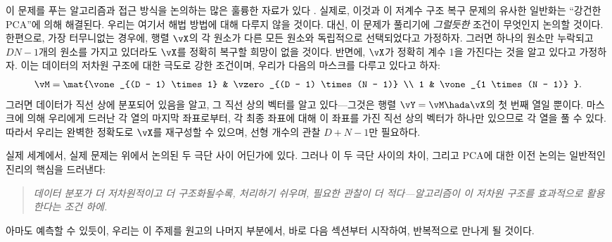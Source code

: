 \documentclass[../../book-main_ko.tex]{subfiles}
\begin{document}
이 문제를 푸는 알고리즘과 접근 방식을 논의하는 많은 훌륭한 자료가 있다 \cite{Wright-Ma-2022}. 실제로, 이것과 이 저계수 구조 복구 문제의 유사한 일반화는 ``강건한 PCA''에 의해 해결된다. 우리는 여기서 해법 방법에 대해 다루지 않을 것이다. 대신, 이 문제가 풀리기에 \textit{그럴듯한} 조건이 무엇인지 논의할 것이다. 한편으로, 가장 터무니없는 경우에, 행렬 \(\vX\)의 각 원소가 다른 모든 원소와 독립적으로 선택되었다고 가정하자. 그러면 하나의 원소만 누락되고 \(DN - 1\)개의 원소를 가지고 있더라도 \(\vX\)를 정확히 복구할 희망이 없을 것이다. 반면에, \(\vX\)가 정확히 계수 1을 가진다는 것을 알고 있다고 가정하자. 이는 데이터의 저차원 구조에 대한 극도로 강한 조건이며, 우리가 다음의 마스크를 다루고 있다고 하자:
\begin{equation}
    \vM = \mat{\vone_{(D - 1) \times 1} & \vzero_{(D - 1) \times (N - 1)} \\ 1 & \vone_{1 \times (N - 1)} }.
\end{equation}
그러면 데이터가 직선 상에 분포되어 있음을 알고, 그 직선 상의 벡터를 알고 있다---그것은 행렬 \(\vY = \vM \hada \vX\)의 첫 번째 열일 뿐이다. 마스크에 의해 우리에게 드러난 각 열의 마지막 좌표로부터, 각 최종 좌표에 대해 이 좌표를 가진 직선 상의 벡터가 하나만 있으므로 각 열을 풀 수 있다. 따라서 우리는 완벽한 정확도로 \(\vX\)를 재구성할 수 있으며, 선형 개수의 관찰 \(D + N - 1\)만 필요하다.

실제 세계에서, 실제 문제는 위에서 논의된 두 극단 사이 어딘가에 있다. 그러나 이 두 극단 사이의 차이, 그리고 PCA에 대한 이전 논의는 일반적인 진리의 핵심을 드러낸다:
\begin{quote}
    \centering
    \textit{데이터 분포가 더 저차원적이고 더 구조화될수록, 처리하기 쉬우며, 필요한 관찰이 더 적다---알고리즘이 이 저차원 구조를 효과적으로 활용한다는 조건 하에.}
\end{quote}
아마도 예측할 수 있듯이, 우리는 이 주제를 원고의 나머지 부분에서, 바로 다음 섹션부터 시작하여, 반복적으로 만나게 될 것이다.
\end{document}
